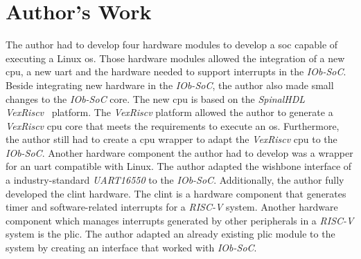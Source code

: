 \section{Author's Work}
\label{section:authors_work}
The author had to develop four hardware modules to develop a \acrfull{soc} capable of executing a Linux \acrshort{os}. Those hardware modules allowed the integration of a new \acrshort{cpu}, a new \acrshort{uart} and the hardware needed to support interrupts in the \textit{IOb-SoC}. Beside integrating new hardware in the \textit{IOb-SoC}, the author also made small changes to the \textit{IOb-SoC} core. The new \acrshort{cpu} is based on the \textit{SpinalHDL}~\cite{papon2017spinalhdl} \textit{VexRiscv}~\cite{vexriscv} platform. The \textit{VexRiscv} platform allowed the author to generate a \textit{VexRiscv} \acrshort{cpu} core that meets the requirements to execute an \acrlong{os}. Furthermore, the author still had to create a \acrshort{cpu} wrapper to adapt the \textit{VexRiscv} \acrshort{cpu} to the \textit{IOb-SoC}. Another hardware component the author had to develop was a wrapper for an \acrshort{uart} compatible with Linux. The author adapted the wishbone interface of a industry-standard \textit{UART16550} to the \textit{IOb-SoC}. Additionally, the author fully developed the \acrshort{clint} hardware. The \acrshort{clint} is a hardware component that generates timer and software-related interrupts for a \textit{RISC-V} system. Another hardware component which manages interrupts generated by other peripherals in a \textit{RISC-V} system is the \acrshort{plic}. The author adapted an already existing \acrshort{plic} module to the system by creating an interface that worked with \textit{IOb-SoC}.

